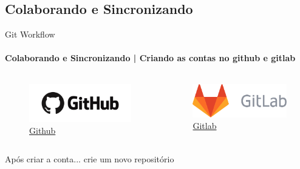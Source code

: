 \documentclass[xcolor=dvipsnames,t]{beamer}
\begin{document}
\subsection{Colaborando e Sincronizando}
\begin{frame}[fragile]{Git Workflow}
\framesubtitle{Colaborando e Sincronizando  | Criando as contas no github e gitlab}

\vfill
\begin{columns}[t]
	\begin{column}{.5\textwidth}
		\begin{figure}
			\centering
			\includegraphics[width=0.7\linewidth]{figures/Github_logo}
			\caption*{	\href{https://github.com/}{\color{blue}Github}}
		\end{figure}
	\end{column}
	\begin{column}{.5\textwidth}
		\begin{figure}
			\centering
			\includegraphics[width=0.7\linewidth]{figures/GitLab_logo}
			\caption*{\href{https://gitlab.com/}{\color{blue}Gitlab}}
		\end{figure}		
	\end{column}
\end{columns}
\vfill
\begin{exampleblock}{Após criar a conta...}
 crie um novo repositório
\end{exampleblock}
\vfill
\end{frame}
\end{document}
